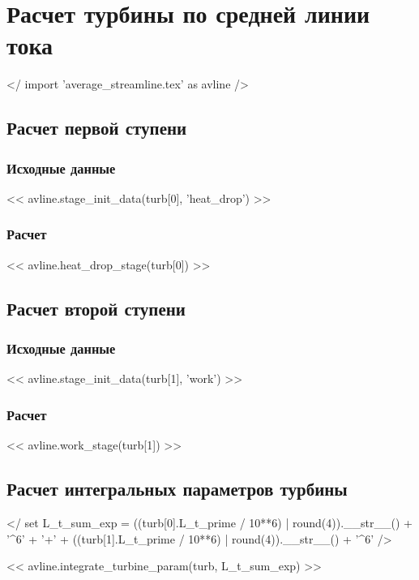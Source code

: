 \documentclass[a4paper,10pt]{article}
\begin{document}
    \section{Расчет турбины по средней линии тока}

    </ import 'average_streamline.tex' as avline />

    \subsection{Расчет первой ступени}

    \subsubsection{Исходные данные}

    << avline.stage_init_data(turb[0], 'heat_drop') >>

    \subsubsection{Расчет}

    << avline.heat_drop_stage(turb[0]) >>

    \subsection{Расчет второй ступени}

    \subsubsection{Исходные данные}

    << avline.stage_init_data(turb[1], 'work') >>

    \subsubsection{Расчет}

    << avline.work_stage(turb[1]) >>

    \subsection{Расчет интегральных параметров турбины}

    </ set L_t_sum_exp = ((turb[0].L_t_prime / 10**6) | round(4)).__str__() + '^6' + '+' +
        ((turb[1].L_t_prime / 10**6) | round(4)).__str__() + '^6' />

    << avline.integrate_turbine_param(turb, L_t_sum_exp) >>
\end{document}
